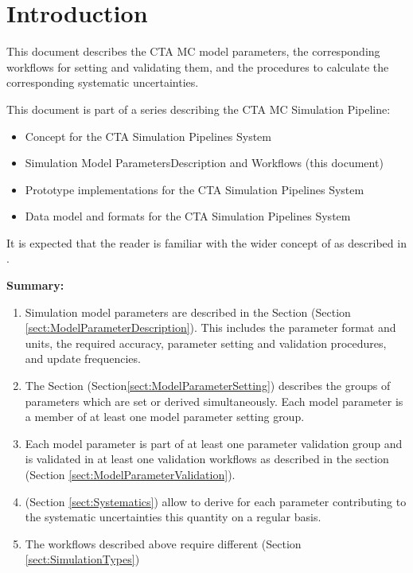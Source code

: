 \section{Introduction}

This document describes the CTA MC model parameters, the corresponding workflows for setting and validating them, and the procedures to calculate the corresponding systematic uncertainties.

This document is part of a series describing the CTA MC Simulation Pipeline:

\begin{itemize}
    \item Concept for the CTA Simulation Pipelines System \cite{CTAConcept}
    \item Simulation Model ParametersDescription and Workflows (this document)
    \item Prototype implementations for the CTA Simulation Pipelines System
    \item Data model and formats for the CTA Simulation Pipelines System 
\end{itemize}
It is expected that the reader is familiar with the wider concept of \simsys as described in  \cite{CTAConcept}.

\textbf{Summary:}
\begin{enumerate}
    \item Simulation model parameters are described in the Section \textbf{} (Section \ref{sect:ModelParameterDescription}). 
    This includes the parameter format and units, the required accuracy, parameter setting and validation procedures, and update frequencies.
    
    \item The Section \textbf{} (Section\ref{sect:ModelParameterSetting}) describes the groups of parameters which are set or derived simultaneously. Each model parameter is a member of at least one model parameter setting group.
    
    \item Each model parameter is part of at least one parameter validation group and is validated in at least one validation workflows as described in the section \textbf{} (Section \ref{sect:ModelParameterValidation}).
    
    \item  \textbf{} (Section \ref{sect:Systematics}) allow to derive for each parameter contributing to the systematic uncertainties this quantity on a regular basis.
    
    \item The workflows described above require different \textbf{} (Section \ref{sect:SimulationTypes})
    
\end{enumerate}

